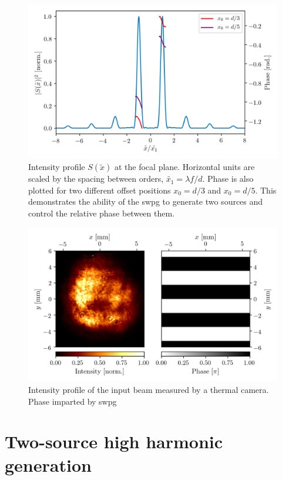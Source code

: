 \begin{figure}
	\centering
	\includegraphics[width=1.0\textwidth]{figures/Two_source/intensity_and_phase.png}
	\caption{Intensity profile $S(\tilde{x})$ at the focal plane. Horizontal units are scaled by the spacing between orders, $\tilde{x_1}=\lambda f/d$.  Phase is also plotted for two different offset positions $x_0=d/3$ and $x_0=d/5$.  This demonstrates the ability of the \gls{swpg} to generate two sources and control the relative phase between them.}
	\label{fig:s^2}
\end{figure}

\begin{figure}
	\centering
	\includegraphics[width=1.0\textwidth]{figures/Two_source/LP_images.png}
	\caption{Intensity profile of the input beam measured by a thermal camera. Phase imparted by \gls{swpg}}
	\label{fig:LP_inputs}
\end{figure}


\section{Two-source high harmonic generation}








